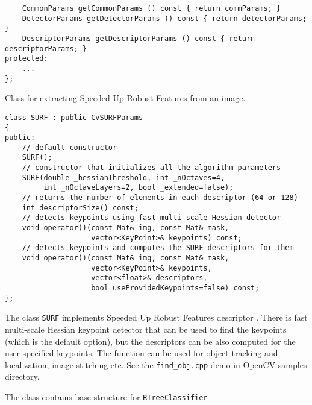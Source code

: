 \begin{lstlisting}
    CommonParams getCommonParams () const { return commParams; }
    DetectorParams getDetectorParams () const { return detectorParams; }
    DescriptorParams getDescriptorParams () const { return descriptorParams; }
protected:
    ...
};
\end{lstlisting}

Class for extracting Speeded Up Robust Features from an image.

\begin{lstlisting}
class SURF : public CvSURFParams
{
public:
    // default constructor
    SURF();
    // constructor that initializes all the algorithm parameters
    SURF(double _hessianThreshold, int _nOctaves=4,
         int _nOctaveLayers=2, bool _extended=false);
    // returns the number of elements in each descriptor (64 or 128)
    int descriptorSize() const;
    // detects keypoints using fast multi-scale Hessian detector
    void operator()(const Mat& img, const Mat& mask,
                    vector<KeyPoint>& keypoints) const;
    // detects keypoints and computes the SURF descriptors for them
    void operator()(const Mat& img, const Mat& mask,
                    vector<KeyPoint>& keypoints,
                    vector<float>& descriptors,
                    bool useProvidedKeypoints=false) const;
};
\end{lstlisting}

The class \texttt{SURF} implements Speeded Up Robust Features descriptor \cite{Bay06}.
There is fast multi-scale Hessian keypoint detector that can be used to find the keypoints
(which is the default option), but the descriptors can be also computed for the user-specified keypoints.
The function can be used for object tracking and localization, image stitching etc. See the
\texttt{find\_obj.cpp} demo in OpenCV samples directory.

The class contains base structure for \texttt{RTreeClassifier}

